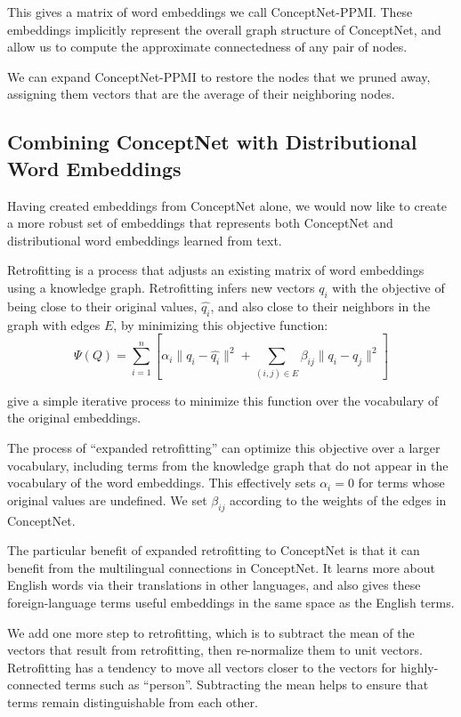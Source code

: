 \documentclass[letterpaper]{article}
\begin{document}
This gives a matrix of word embeddings we call ConceptNet-PPMI.  These
embeddings implicitly represent the overall graph structure of ConceptNet, and
allow us to compute the approximate connectedness of any pair of nodes.

We can expand ConceptNet-PPMI to restore the nodes that we pruned away,
assigning them vectors that are the average of their neighboring nodes.

\subsection{Combining ConceptNet with Distributional Word Embeddings}

Having created embeddings from ConceptNet alone, we would now like to create
a more robust set of embeddings that represents both ConceptNet and distributional
word embeddings learned from text.

Retrofitting \cite{faruqui2015retrofitting} is a process that adjusts an
existing matrix of word embeddings using a knowledge graph. Retrofitting
infers new vectors $q_i$ with the objective of being close to their original
values, $\hat{q_i}$, and also close to their neighbors in the graph with edges $E$,
by minimizing this objective function:
$$\Psi(Q) = \sum_{i=1}^{n}\left[
    \alpha_i \lVert q_i - \hat{q_i} \rVert ^2 + \sum_{(i, j) \in E} \beta_{ij} \lVert q_i - q_j \rVert ^2
\right] $$

\citeauthor{faruqui2015retrofitting} give a simple iterative process to minimize
this function over the vocabulary of the original embeddings.

The process of ``expanded retrofitting'' \cite{speer2016ensemble} can optimize
this objective over a larger vocabulary, including terms from the knowledge
graph that do not appear in the vocabulary of the word embeddings. This
effectively sets $\alpha_i = 0$ for terms whose original values are undefined.
We set $\beta_{ij}$ according to the weights of the edges in ConceptNet.

The particular benefit of expanded retrofitting to ConceptNet is that it can
benefit from the multilingual connections in ConceptNet. It learns more about
English words via their translations in other languages, and also gives these
foreign-language terms useful embeddings in the same space as the English
terms.

We add one more step to retrofitting, which is to subtract the mean of the
vectors that result from retrofitting, then re-normalize them to unit vectors.
Retrofitting has a tendency to move all vectors closer to the vectors for
highly-connected terms such as ``person''. Subtracting the mean helps to ensure
that terms remain distinguishable from each other.
\end{document}
